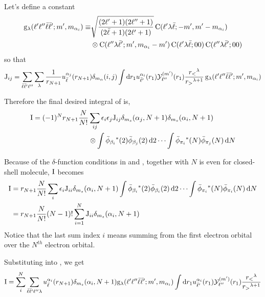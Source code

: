 \documentclass[aps,pra,groupedaddress,12pt,
               amsfonts,amssymb,
               preprint
    ]{revtex4}
\begin{document}
Let's define a constant
\begin{equation}
  \label{eq:gl}
  \begin{split}
  \mathrm{g}_{\lambda}(\ell'\ell''\bar{\ell}\bar{\ell}';m',m_{\alpha_i}) \equiv &
  \sqrt{\dfrac{(2\ell'+1)(2\ell''+1)}{(2\bar{\ell}+1)(2\ell'+1)}}\,\mathrm{C}(\ell'\lambda\bar{\ell};-m',m'-m_{\alpha_i}) \\
            &\otimes\mathrm{C}(\ell''\lambda\bar{\ell}';m',m_{\alpha_i}-m')\,\mathrm{C}(\ell'\lambda\bar{\ell};00)\,\mathrm{C}(\ell''\lambda\bar{\ell}';00)
  \end{split}
\end{equation}
so that
\begin{equation}
  \label{eq:Iexg}
  \mathrm{J}_{ij} = \sum_{\bar{\ell}\bar{\ell}'\ell''}\sum_{\lambda}
            \dfrac{1}{r_{N+1}}u_{\bar{\ell}}^{{\alpha_j}}(r_{N+1})\delta_{m_\alpha}(i,j)\int\mathrm{d}
               r_1u_{\bar{\ell}'}^{{\alpha_i}}(r_1)\mathcal{Y}_{\ell''}^{(m')}(r_1)\dfrac{r_<{}^\lambda}{r_>{}^{\lambda+1}}\,\mathrm{g}_{\lambda}(\ell'\ell''\bar{\ell}\bar{\ell}';m',m_{\alpha_i})
\end{equation}

Therefore the final desired integral of  is,
\begin{equation}
  \label{eq:Iexh}
  \begin{split}
    \mathrm{I} = (-1)^{N}r_{N+1}\dfrac{N}{N!}
    &\sum_{ij}\epsilon_i\epsilon_j\mathrm{J}_{ij}\delta_{m_s}(\alpha_j,N+1)\delta_{m_s}(\alpha_i,N+1) \\
    &\otimes\int\bar{\phi}_{\beta_i}{}^*(2)\bar{\phi}_{\beta_j}(2)\,\mathrm{d} 2\cdots\int\bar{\phi}_{\pi_i}{}^*(N)\bar{\phi}_{\pi_j}(N)\,\mathrm{d} N 
  \end{split}
\end{equation}

Because of the $\delta$-function conditions in  and ,
together with $N$ is even for closed-shell molecule, $\mathrm{I}$ becomes
\begin{equation}
  \label{eq:Iexha}
  \begin{split}
    \mathrm{I} & = r_{N+1}\dfrac{N}{N!}
    \sum_{i}\epsilon_i\mathrm{J}_{ii}\delta_{m_s}(\alpha_i,N+1)\int\bar{\phi}_{\beta_i}{}^*(2)\bar{\phi}_{\beta_i}(2)\,\mathrm{d} 2\cdots\int\bar{\phi}_{\pi_i}{}^*(N)\bar{\phi}_{\pi_i}(N)\,\mathrm{d} N \\
       & = r_{N+1}\dfrac{N}{N!}
    (N-1)!\sum_{i=1}^{N}\mathrm{J}_{ii}\delta_{m_s}(\alpha_i,N+1)
  \end{split}
\end{equation}
Notice that the last sum index $i$ means summing from the first electron
orbital over the $N^{th}$ electron orbital.

Substituting  into , we get
\begin{equation}
  \label{eq:Iexi}
  \mathrm{I} = \sum_{i}^{N}\sum_{\bar{\ell}\bar{\ell}'\ell''\lambda}
            u_{\bar{\ell}}^{{\alpha_i}}(r_{N+1})\delta_{m_s}(\alpha_i,N+1)\mathrm{g}_{\lambda}(\ell'\ell''\bar{\ell}\bar{\ell}';m',m_{\alpha_i})\int\mathrm{d}
               r_1u_{\bar{\ell}'}^{{\alpha_i}}(r_1)\mathcal{Y}_{\ell''}^{(m')}(r_1)\dfrac{r_<{}^\lambda}{r_>{}^{\lambda+1}}
\end{equation}
\end{document}
